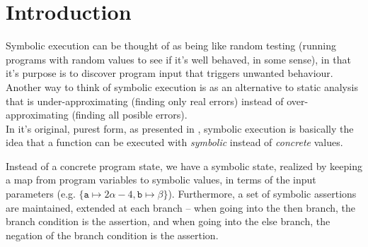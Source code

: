 \documentclass[11pt]{report}
\begin{document}

\pagestyle{empty} 
\vspace*{\fill}
\clearpage


\pagestyle{plain}


\setcounter{tocdepth}{1}
\tableofcontents
{}
\setcounter{secnumdepth}{2}


\chapter{Introduction}
\label{ch:intro}

Symbolic execution can be thought of as being like random testing
(running programs with random values to see if it's well behaved, in
some sense), in that it's purpose is to discover program input that
triggers unwanted behaviour. Another way to think of symbolic
execution is as an alternative to static analysis that is
under-approximating (finding only real errors) instead of
over-approximating (finding all posible errors). \\

In it's original, purest form, as presented in \cite{King:1976},
symbolic execution is basically the idea that a function can be
executed with {\it symbolic} instead of {\it concrete}
values. 

Instead of a concrete program state, we have a symbolic state,
realized by keeping a map from program variables to symbolic values,
in terms of the input parameters (e.g. $\{\texttt{a} \mapsto
2\alpha-4, \texttt{b} \mapsto \beta\}$). Furthermore, a set of
symbolic assertions are maintained, extended at each branch -- when
going into the then branch, the branch condition is the assertion, and
when going into the else branch, the negation of the branch condition
is the assertion.
\end{document}
